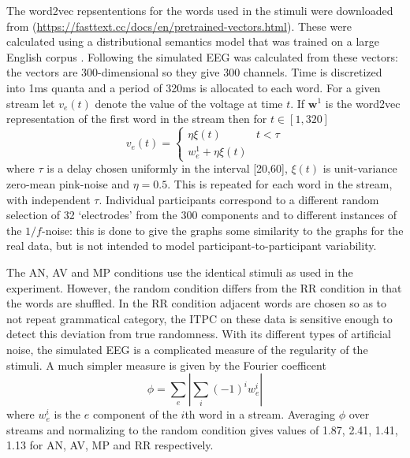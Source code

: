 \documentclass[10pt,letterpaper]{article}
\newcommand{\citet}[1]{\cite{#1}}
\begin{document}
The word2vec repsententions for the words used in the stimuli were
downloaded from
(\url{https://fasttext.cc/docs/en/pretrained-vectors.html}). These
were calculated using a distributional semantics model that was
trained on a large English corpus \citet{Bojanowski2017}. Following
\cite{FrankYang2018} the simulated EEG was calculated from these
vectors: the vectors are 300-dimensional so they give 300 channels.
Time is discretized into 1ms quanta and a period of 320ms is allocated
to each word. For a given stream let $v_e(t)$ denote the value of the
voltage at time $t$. If $\textbf{w}^1$ is the word2vec representation
of the first word in the stream then for $t\in [1,320]$
\begin{equation}
  v_e(t)=\left\{\begin{array}{ll}\eta\xi(t)&t<\tau\\ w^1_e+\eta\xi(t)\end{array}\right.
\end{equation}
where $\tau$ is a delay chosen uniformly in the interval [20,60],
$\xi(t)$ is unit-variance zero-mean pink-noise and $\eta=0.5$. This is
repeated for each word in the stream, with independent
$\tau$. Individual participants correspond to a different random
selection of 32 `electrodes' from the 300 components and to different
instances of the $1/f$-noise: this is done to give the graphs some
similarity to the graphs for the real data, but is not intended to
model participant-to-participant variability.

The AN, AV and MP conditions use the identical stimuli as used in the
experiment. However, the random condition differs from the RR
condition in that the words are shuffled. In the RR condition adjacent
words are chosen so as to not repeat grammatical category, the ITPC on
these data is sensitive enough to detect this deviation from true
randomness. With its different types of artificial noise, the
simulated EEG is a complicated measure of the regularity of the
stimuli. A much simpler measure is given by the Fourier coefficent
\begin{equation}
  \phi= \sum_e\left|\sum_i (-1)^iw_e^i\right|
\end{equation}
where $w_e^i$ is the $e$ component of the $i$th word in a
stream. Averaging $\phi$ over streams and normalizing to the random
condition gives values of 1.87, 2.41, 1.41, 1.13 for AN, AV, MP and RR
respectively.
\end{document}
